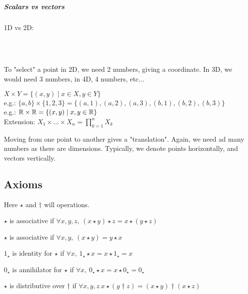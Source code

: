 \subparagraph{Scalars vs vectors}
1D vs 2D:\vspace{0.2cm}\\
\\
\\
To "select" a point in 2D, we need 2 numbers, giving a coordinate.
In 3D, we would need 3 numbers, in 4D, 4 numbers, etc...
\begin{definition}
    $X \times Y = \{ (x,y) \mid x \in X, y \in Y \}$\\
    e.g.: $\{a,b\} \times \{1,2,3\} = \{ (a,1),(a,2),(a,3), (b,1),(b,2),(b,3) \}$\\
    e.g.: $\mathbb{R} \times \mathbb{R} = \{ (x,y) \mid x,y \in \mathbb{R} \}$\\
    Extension: $X_1 \times \dots \times X_n = \prod_{k=1}^n X_k$
\end{definition}
Moving from one point to another gives a "translation".
Again, we need ad many numbers as there are dimensions.
Typically, we denote points horizontally, and vectors vertically.

\subsection{Axioms}
Here $ \star $ and $ \dagger $ will operations.
\begin{definition}[Associativity]
    $\star$ is associative if $\forall x,y,z, \ (x \star y) \star z = x \star (y \star z)$
\end{definition}
\begin{definition}[Commutativity]
    $\star$ is associative if $\forall x,y, \ (x \star y) = y \star x$
\end{definition}
\begin{definition}[Identity]
    $1_{\star}$ is identity for $\star$ if $\forall x, \ 1_{\star} \star x = x \star 1_{\star} = x$
\end{definition}
\begin{definition}[Annihilator]
    $0_{\star}$ is annihilator for $\star$ if $\forall x, \ 0_{\star} \star x = x \star 0_{\star} = 0_{\star}$
\end{definition}
\begin{definition}[Distributivity]
    $\star$ is distributive over $\dagger$ if $\forall x,y,z \ x \star (y \dagger z) = (x \star y) \dagger (x \star z)$
\end{definition}


